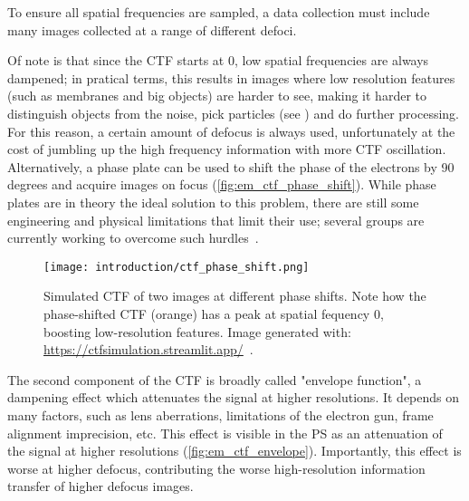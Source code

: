 To ensure all spatial frequencies are sampled, a data collection must include many images collected at a range of different defoci.

Of note is that since the CTF starts at \num{0}, low spatial frequencies are always dampened; in pratical terms, this results in images where low resolution features (such as membranes and big objects) are harder to see, making it harder to distinguish objects from the noise, pick particles (see ) and do further processing.
For this reason, a certain amount of defocus is always used, unfortunately at the cost of jumbling up the high frequency information with more CTF oscillation.
Alternatively, a phase plate can be used to shift the phase of the electrons by 90 degrees and acquire images on focus (\autoref{fig:em_ctf_phase_shift}).
While phase plates are in theory the ideal solution to this problem, there are still some engineering and physical limitations that limit their use; several groups are currently working to overcome such hurdles~\cite{danevExpandingBoundariesCryoEM2017,schwartzLaserPhasePlate2019}.

\begin{figure}[ht]
    \centering
    \texttt{[image: introduction/ctf\_phase\_shift.png]}
    \caption[CTF: effect of phase shift]{Simulated CTF of two images at different phase shifts. Note how the phase-shifted CTF (orange) has a peak at spatial fequency \num{0}, boosting low-resolution features. Image generated with: \url{https://ctfsimulation.streamlit.app/}~\cite{jiangWebbasedSimulationContrast2001}.}
    \label{fig:em_ctf_phase_shift}
\end{figure}

The second component of the CTF is broadly called "envelope function", a dampening effect which attenuates the signal at higher resolutions.
It depends on many factors, such as lens aberrations, limitations of the electron gun, frame alignment imprecision, etc.
This effect is visible in the PS as an attenuation of the signal at higher resolutions (\autoref{fig:em_ctf_envelope}).
Importantly, this effect is worse at higher defocus, contributing the worse high-resolution information transfer of higher defocus images.

